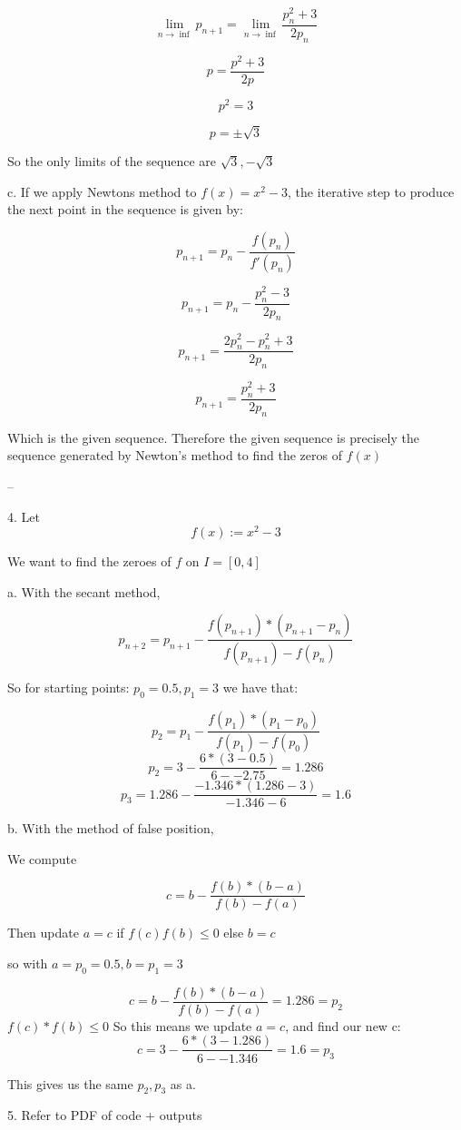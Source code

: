 \documentclass{article}
\begin{document}
$$\lim_{n \to \inf} p_{n+1} = \lim_{n \to \inf} \frac{p_n^2+3}{2p_n}$$

$$p =  \frac{p^2+3}{2p}$$

$$p^2 = 3$$

$$p = \pm \sqrt{3}$$

So the only limits of the sequence are $ \sqrt{3}, -\sqrt{3}$

c. If we apply Newtons method to $f(x) = x^2 - 3$, the iterative step to produce the next point in the sequence is given by: 

$$p_{n+1} = p_n - \frac{f(p_n)}{f'(p_n)}$$

$$p_{n+1} = p_n - \frac{p_n^2 - 3}{2p_n}$$

$$p_{n+1} = \frac{2p_n^2-p_n^2 + 3}{2p_n}$$

$$p_{n+1} = \frac{p_n^2 + 3}{2p_n}$$

Which is the given sequence. Therefore the given sequence is precisely the sequence generated by Newton's method to find the zeros of $f(x)$

--

4.
Let $$f(x) := x^2 - 3$$ 

We want to find the zeroes of $f$ on $I =[0, 4]$

a. With the secant method,

$$p_{n+2} = p_{n+1} - \frac{f(p_{n+1}) *(p_{n+1}-p_n)}{f(p_{n+1}) - f(p_n)}$$

So for starting points:  $p_0 =0.5, p_1 = 3$ we have that:

$$p_2 = p_{1} - \frac{f(p_{1}) *(p_{1}-p_0)}{f(p_{1}) - f(p_0)}$$
$$p_2 = 3 - \frac{6 *(3-0.5)}{6 - -2.75} = 1.286$$
$$p_3 = 1.286 - \frac{-1.346 *(1.286-3)}{-1.346 - 6} = 1.6$$

b. With the method of false position,

We compute 

$$c = b - \frac{f(b) *(b-a)}{f(b) - f(a)}$$

Then update $a = c$ if $f(c)f(b) \le 0$ else $b = c$

so with $a = p_0 = 0.5, b = p_1 = 3$

$$c = b - \frac{f(b) *(b-a)}{f(b) - f(a)} = 1.286 = p_2$$
$f(c)*f(b) \le 0$ So this means we update $a = c$, and find our new c: 
$$c = 3 - \frac{6 *(3-1.286)}{6 - -1.346} = 1.6 = p_3$$

This gives us the same $p_2, p_3$ as a.

5. Refer to PDF of code + outputs
\end{document}
